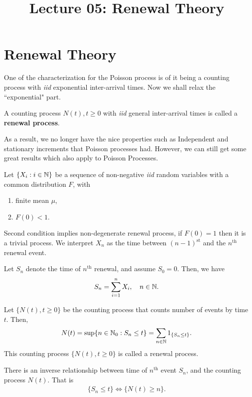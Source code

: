 \documentclass[a4paper,10pt, english]{article}
\title{Lecture 05: Renewal Theory}
\author{}
\begin{document}
\maketitle

\section{Renewal Theory}
One of the characterization for the Poisson process is of it being a counting process with \emph{iid} exponential inter-arrival times. Now we shall relax the ``exponential" part. 
\begin{defn} A counting process ${N(t),t \geq 0}$ with \emph{iid} general inter-arrival times is called a \textbf{renewal process}.
\end{defn}
As a result, we no longer have the nice properties such as Independent and stationary increments that Poisson processes had. However, we can still get some great results which also apply to Poisson Processes. 

\begin{defn} Let $\{X_i: i \in \mathbb{N}\}$ be a sequence of non-negative \emph{iid} random variables with a common distribution $F$, with 
	\begin{enumerate}
		\item finite mean $\mu$, %
		\item $F(0) < 1$.%
	\end{enumerate}
\end{defn}
Second condition implies non-degenerate renewal process, if $F(0) = 1$ then it is a trivial process. We interpret $X_n$ as the time between $(n - 1)^{\text{st}}$ and the $n^{\text{th}}$ renewal event. 
\begin{defn} Let $S_n$ denote the time of $n^{\text{th}}$ renewal, and assume $S_0 = 0$. Then, we have
\begin{align*} 
S_n = \sum_{i=1}^n X_i, \quad n\in \mathbb{N}. 
\end{align*}
\end{defn}
\begin{defn} Let $\{N(t), t \geq 0\}$ be the counting process that counts number of events by time $t$. Then,
	\begin{align*} 
	N(t) = \sup\{n \in \mathbb{N}_0 : S_n \leq t\} = \sum_{n \in \mathbb{N}}1_{\{S_n \leq t\}}.
	\end{align*} 
	This counting process $\{N(t), t \geq 0\}$ is called a renewal process.
\end{defn}
\begin{lem}
	There is an inverse relationship between time of $n^{\text{th}}$ event $S_n$, and the counting process $N(t)$. That is
	\begin{align}
	\label{eq:InverseRelationship}
	\{S_n \leq t\} \iff \{N(t) \geq n\}.
	\end{align}
\end{lem}
\end{document}

